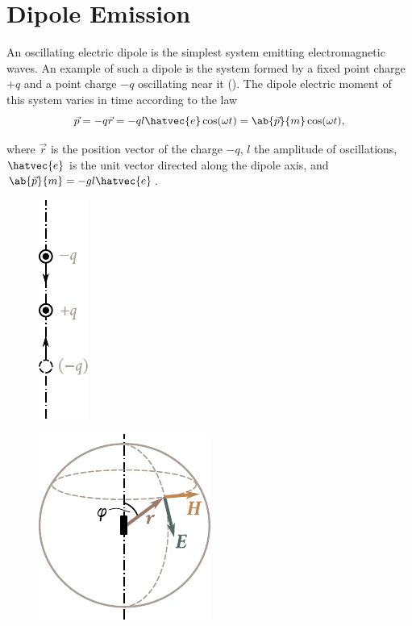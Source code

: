 \section{Dipole Emission}\label{sec:15_6}

An oscillating electric dipole is the simplest system emitting electromagnetic waves.
An example of such a dipole is the system formed by a fixed point charge $+q$ and a point charge $-q$ oscillating near it ().
The dipole electric moment of this system varies in time according to the law
\begin{equation}\label{eq:15_42}
    \vec{p} = -q \vec{r} = - ql \hatvec{e} \cos(\omega t) = \ab{\vec{p}}{m} \cos(\omega t),
\end{equation}

\noindent
where $\vec{r}$ is the position vector of the charge $-q$, $l$ the amplitude of oscillations, $\hatvec{e}$ is the unit vector directed along the dipole axis, and $\ab{\vec{p}}{m} =-gl\hatvec{e}$.

\begin{figure}[!htb]
	\begin{minipage}[t]{0.48\linewidth}
		\begin{center}
			\includegraphics[scale=1]{figures/ch_15/fig_15_5.pdf}
			\caption[]{}
			\label{fig:15_5}
		\end{center}
	\end{minipage}
	\hfill{ }%
	\begin{minipage}[t]{0.48\linewidth}
		\begin{center}
			\includegraphics[scale=1]{figures/ch_15/fig_15_6.pdf}
			\caption[]{}
			\label{fig:15_6}
		\end{center}
	\end{minipage}
\vspace{-0.4cm}
\end{figure}

